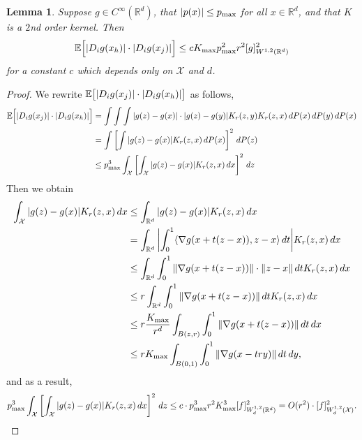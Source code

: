 \documentclass{article}
\newcommand{\Reals}{\mathbb{R}}
\newcommand{\1}{\mathbf{1}}
\newcommand{\Rd}{\Reals^d}
\newcommand{\Xset}{\mathcal{X}}
\newcommand{\Ebb}{\mathbb{E}}
\newcommand{\dotp}[2]{\langle #1, #2 \rangle}
\theoremstyle{alden}
\theoremstyle{aldenthm}
\newtheorem{lemma}{Lemma}
\theoremstyle{definition}
\theoremstyle{remark}
\begin{document}
\begin{lemma}
	\label{lem:expected_first_order_seminorm_2}
	Suppose $g \in C^{\infty}(\Rd)$, that $\abs{p(x)} \leq p_{\max}$ for all $x \in \Rd$, and that $K$ is a $2$nd order kernel. Then
	\begin{equation*}
	\Ebb\Bigl[\abs{D_ig(x_h)}\cdot\abs{D_ig(x_j)} \Bigr] \leq c K_{\max} p_{\max}^2 r^2 [g]_{W^{1,2}(\Rd)}^2
	\end{equation*}
	for a constant $c$ which depends only on $\Xset$ and $d$.
\end{lemma}
\begin{proof}
	We rewrite $\Ebb\bigl[\abs{D_{i}g(x_j)} \cdot \abs{D_ig(x_h)} \bigr]$ as follows,
	\begin{align*}
	\Ebb\Bigl[\abs{D_{i}g(x_j)} \cdot \abs{D_ig(x_h)} \Bigr] & = \int \int \int \abs{g(z) - g(x)} \cdot \abs{g(z) - g(y)} K_r(z,y) K_r(z,x) \,dP(x) \,dP(y) \,dP(x) \\
	& = \int \left[\int \abs{g(z) - g(x)} K_r(z,x) \,dP(x)\right]^2 \,dP(z) \\
	& \leq p_{\max}^3 \int_{\Xset} \left[\int_{\Xset} \abs{g(z) - g(x)} K_r(z,x) \,dx\right]^2 \,dz
	\end{align*}
	Then we obtain
	\begin{align*}
	\int_{\Xset} \abs{g(z) - g(x)} K_r(z,x) \,dx & \leq \int_{\Rd} \abs{g(z) - g(x)} K_r(z,x) \,dx \\
	& = \int_{\Rd} \abs{\int_{0}^{1} \dotp{\nabla g(x + t(z - x))}{z - x} \,dt} K_r(z,x) \,dx \\
	& \leq \int_{\Rd} \int_{0}^{1} \norm{\nabla g(x + t(z - x))}\cdot\norm{z - x} \,dt K_r(z,x) \,dx \\
	& \leq r \int_{\Rd} \int_{0}^{1} \norm{\nabla g(x + t(z - x))} \,dt K_r(z,x) \,dx \\
	& \leq r \frac{K_{\max}}{r^d} \int_{B(z,r)} \int_{0}^{1} \norm{\nabla g(x + t(z - x))} \,dt  \,dx \\
	& \leq r K_{\max} \int_{B(0,1)} \int_{0}^{1} \norm{\nabla g(x - try)} \,dt  \,dy,
	\end{align*}
	and as a result, 
	\begin{equation*}
	p_{\max}^3 \int_{\Xset} \left[\int_{\Xset} \abs{g(z) - g(x)} K_r(z,x) \,dx\right]^2 \,dz \leq c\cdot p_{\max}^3 r^2 K_{\max}^3 [f]_{W_d^{1,2}(\Rd)}^2 = O(r^2)\cdot [f]_{W_d^{1,2}(\Xset)}^2.
	\end{equation*}
\end{proof}
\end{document}
